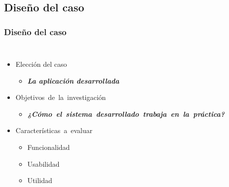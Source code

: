 \documentclass[9pt]{beamer}
\begin{document}
    \subsection{Diseño del caso}
    \begin{frame}
        \frametitle{Diseño del caso}                       
        
        
        \begin{columns}
            \begin{itemize}
                \item Elección del caso
                \begin{itemize}
                    \item \textbf{\textit{La aplicación desarrollada}}
                \end{itemize}
    
                \item Objetivos de la investigación
                \begin{itemize}\justifying
                    \item \textbf{\textit{¿Cómo el sistema desarrollado trabaja en la práctica?}}
                \end{itemize}
    
                \item Características a evaluar
                \begin{itemize}
                    \item Funcionalidad
                    \item Usabilidad
                    \item Utilidad
                \end{itemize}
            \end{itemize}


\end{columns}
\end{frame}
\end{document}
